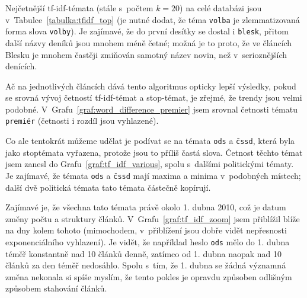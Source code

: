 \documentclass[12pt,a4paper]{report}
\begin{document}

Nejčetnější tf-idf-témata (stále s~počtem $k=20$) na celé databázi jsou v~Tabulce~\ref{tabulka:tfidf_top} (je nutné dodat, že téma \texttt{volba} je zlemmatizovaná forma slova \texttt{volby}). Je zajímavé, že do první desítky se dostal i \texttt{blesk}, přitom další názvy deníků jsou mnohem méně četné; možná je to proto, že ve článcích Blesku je mnohem častěji zmiňován samotný název novin, než v~serioznějších denících.



Ač na jednotlivých článcích dává tento algoritmus opticky lepší výsledky, pokud se srovná vývoj četností tf-idf-témat a stop-témat, je zřejmé, že trendy jsou velmi podobné. V~Grafu~\ref{graf:word_difference_premier} jsem srovnal četnosti tématu \texttt{premiér} (četnosti i rozdíl jsou vyhlazené). 





Co ale tentokrát můžeme udělat je podívat se  na témata \texttt{ods} a \texttt{čssd}, která byla jako stoptémata vyřazena, protože jsou to příliš častá slova. Četnost těchto témat jsem zanesl do Grafu~\ref{graf:tf_idf_various}, spolu s~dalšími politickými tématy. Je zajímavé, že témata \texttt{ods} a \texttt{čssd} mají maxima a minima v~podobných místech; další dvě politická témata tato témata částečně kopírují. 

Zajímavé je, že všechna tato témata  právě okolo 1. dubna 2010, což je datum změny počtu a struktury článků. V~Grafu~\ref{graf:tf_idf_zoom} jsem přiblížil blíže na dny kolem tohoto  (mimochodem, v~přiblížení jsou dobře vidět nepřesnosti exponenciálního vyhlazení). Je vidět, že například heslo \texttt{ods} mělo do 1. dubna téměř konstantně nad 10 článků denně, zatímco od 1. dubna naopak nad 10 článků za den téměř nedosáhlo. Spolu s~tím, že 1. dubna se žádná významná změna nekonala si spíše myslím, že tento pokles je opravdu způsoben odlišným způsobem stahování článků.
\end{document}
